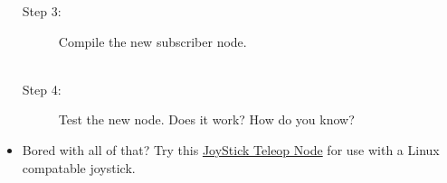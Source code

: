 \documentclass[12pt]{article}
\newcommand{\R}{\color{red}}
\newcommand{\K}{\color{black}}
\newcommand{\G}{\color{mygreen}}
\newcommand{\PR}{\color{mypurple}}
\newcommand{\pkgname}{\G<package\_name>\K}
\newcommand{\wspname}{\R<workspace\_name>\K}
\newcommand{\nodname}{\PR<node\_name>\K}
\newcommand{\home}{\textasciitilde/}
\begin{document}
\begin{itemize}
\begin{description}
\item [Step 3:] Compile the new subscriber node. \\\\



\item [Step 4:] Test the new node. Does it work? How do you know?\\


\end{description}
\vspace*{20mm}
\item Bored with all of that? Try this \href{http://wiki.ros.org/joy/Tutorials/WritingTeleopNode}{JoyStick Teleop Node} for use with a Linux compatable joystick.\\ 

\end{itemize}
\end{document}
